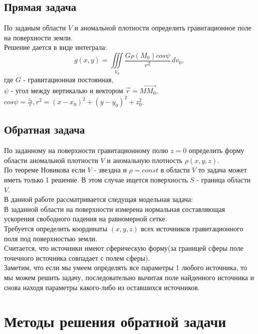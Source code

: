 \documentclass[12pt]{article}
\begin{document}
\subsection
{Прямая задача}
По заданым области $V$ и аномальной плотности определить гравитационное поле на поверхности земли.\\
Решение дается в виде интеграла:\\
\[g(x,y)=\iiint\limits_{V_0}\frac{G\rho(M_0)cos\psi}{r^2}\,dv_0,\] где $G$ - гравитационная постоянная,\\
$\psi$ - угол между вертикалью и вектором $\vec{r} = \overrightarrow{MM_0}$,\\
 $cos\psi=\displaystyle\frac{z_0}{r}, r^2=(x-x_0)^2+(y-y_0)^2+z_0^2$.



\subsection
{Обратная задача}

По заданному на поверхности гравитационному полю $z=0$ определить форму области аномальной плотности $V$ и аномальную плотность $\rho(x,y,z)$.\\
\newline
По теореме Новикова если $V$ - звездна и $\rho = const$ в области $V$ то задача может иметь только 1 решение. В этом случае ищется поверхность $S$ - граница области $V$.\\
\newline
В данной работе рассматривается следущая модельная задача:\\
В заданной области на поверхности измерена нормальная составляющая ускорения свободного падения на равномерной сетке. \\
Требуется определить координаты $(x,y,z)$ всех источников гравитационного поля под поверхностью земли.\\
Считается, что источники имеют сферическую форму(за границей сферы поле точечного источника совпадает с полем сферы).\\
Заметим, что если мы умеем определять все параметры 1 любого источника, то мы можем решить задачу, последовательно вычитая поле найденного источника и снова находя параметры какого-либо из оставшихся источников.

\section
{Методы решения обратной задачи}
 
\end{document}
